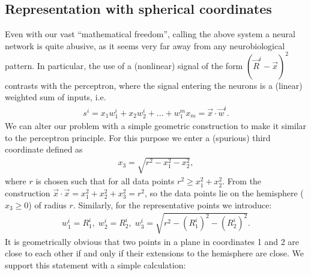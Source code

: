 \documentclass[letterpaper,10pt,english]{jupyterBook}
\begin{document}
\subsection{Representation with spherical coordinates}
\label{\detokenize{docs/unsupervised:representation-with-spherical-coordinates}}
\sphinxAtStartPar
Even with our vast “mathematical freedom”, calling the above system a neural network is quite abusive, as it seems very far away from any neurobiological pattern. In particular, the use of a (non\sphinxhyphen{}linear) signal of the form \(\left(\vec{R}^i-\vec{x}\right)^2\) contrasts with the perceptron, where the signal entering the neurons is a (linear) weighted sum of inputs, i.e.
\begin{equation*}
\begin{split} s ^ i = x_1 w_1 ^ i + x_2 w_2 ^ i + ... + w_1 ^ m x_m = \vec {x} \cdot \vec {w} ^ i. \end{split}
\end{equation*}
\sphinxAtStartPar
We can alter our problem with a simple geometric construction to make it similar to the perceptron principle. For this purpose we enter a (spurious) third coordinate defined as
\begin{equation*}
\begin{split} x_3 = \sqrt {r ^ 2-x_1 ^ 2-x_2 ^ 2}, \end{split}
\end{equation*}
\sphinxAtStartPar
where \( r \) is chosen such that for all data points \( r ^ 2 \ge x_1 ^ 2 + x_2 ^ 2 \).
From the construction \( \vec {x} \cdot \vec {x} = x_1 ^ 2 + x_2 ^ 2 + x_3 ^ 2 = r ^ 2 \), so the data points lie on the hemisphere (\( x_3 \ge 0 \)) of radius \( r \). Similarly, for the representative points we introduce:
\begin{equation*}
\begin{split} w_1 ^ i = R_1 ^ i,  \; w_2 ^ i = R_2 ^ i,  \; 
w_3 ^ i = \sqrt {r ^ 2-(R_1 ^i)^2 -(R_2 ^i)^2}. \end{split}
\end{equation*}
\sphinxAtStartPar
It is geometrically obvious that two points in a plane in coordinates 1 and 2 are close to each other if and only if their extensions to the hemisphere are close. We support this statement with a simple calculation:
\end{document}
